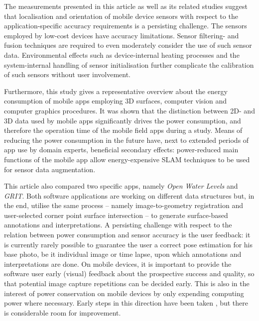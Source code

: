 \documentclass[review]{elsarticle}
\begin{document}
The measurements presented in this article as well as its related studies suggest that localisation and orientation of mobile device sensors with respect to the application-specific accuracy requirements is a persisting challenge. The sensors employed by low-cost devices have accuracy limitations. Sensor filtering- and fusion techniques are required to even moderately consider the use of such sensor data. Environmental effects such as device-internal heating processes and the system-internal handling of sensor initialisation further complicate the calibration of such sensors without user involvement.

Furthermore, this study gives a representative overview about the energy consumption of mobile apps employing 3D surfaces, computer vision and computer graphics procedures. It was shown that the distinction between 2D- and 3D data used by mobile apps significantly drives the power consumption, and therefore the operation time of the mobile field apps during a study. Means of reducing the power consumption in the future have, next to extended periods of app use by domain experts, beneficial secondary effects: power-reduced main functions of the mobile app allow energy-expensive \gls{SLAM} techniques to be used for sensor data augmentation.

This article also compared two specific apps, namely \textit{Open Water Levels} and \textit{\gls{GRIT}}. Both software applications are working on different data structures but, in the end, utilise the same process -- namely image-to-geometry registration and user-selected corner point surface intersection -- to generate surface-based annotations and interpretations. A persisting challenge with respect to the relation between power consumption and sensor accuracy is the user feedback: it is currently rarely possible to guarantee the user a correct pose estimation for his base photo, be it individual image or time lapse, upon which annotations and interpretations are done. On mobile devices,  it is important to provide the software user early (visual) feedback about the prospective success and quality, so that potential image capture repetitions can be decided early. This is also in the interest of power conservation on mobile devices by only expending computing power where necessary. Early steps in this direction have been taken \cite{Kehl2017_VGC}, but there is considerable room for improvement.
\end{document}
